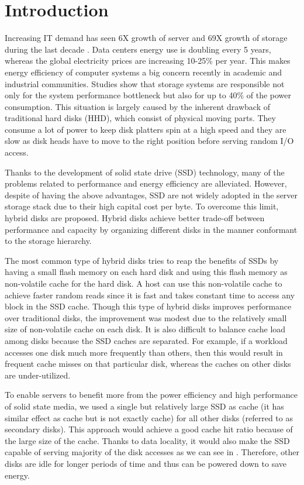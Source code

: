 \section{Introduction}
\label{intro}

Increasing IT demand has seen 6X growth of server and 69X growth of
storage during the last decade \cite{ibm_green_beyond}. Data centers
energy use is doubling every 5 years, whereas the global electricity
prices are increasing 10-25\% per year. This makes energy efficiency
of computer systems a big concern recently in academic and industrial
communities. Studies show that storage systems are responsible not
only for the system performance bottleneck but also for up to 40\% of
the power consumption\cite{storage_40}. This situation is largely
caused by the inherent drawback of traditional hard disks (HHD), which
consist of physical moving parts. They consume a lot of power to keep
disk platters spin at a high speed and they are slow as disk heads
have to move to the right position before serving random I/O access.

Thanks to the development of solid state drive (SSD) technology, many
of the problems related to performance and energy efficiency are
alleviated. However, despite of having the above advantages, SSD are
not widely adopted in the server storage stack due to their high
capital cost per byte. To overcome this limit, hybrid disks are
proposed. Hybrid disks achieve better trade-off between performance
and capacity by organizing different disks in the manner conformant to
the storage hierarchy. 

The most common type of hybrid disks \cite{Bisson07ahybrid} tries to
reap the benefits of SSDs by having a small flash memory on each hard
disk and using this flash memory as non-volatile cache for the hard
disk. A host can use this non-volatile cache to achieve faster random
reads since it is fast and takes constant time to access any block in
the SSD cache. Though this type of hybrid disks improves performance
over traditional disks, the improvement was modest due to the
relatively small size of non-volatile cache on each disk. It is also
difficult to balance cache load among disks because the SSD caches are
separated. For example, if a workload accesses one disk much more
frequently than others, then this would result in frequent cache
misses on that particular disk, whereas the caches on other disks are
under-utilized. 

To enable servers to benefit more from the power efficiency and high
performance of solid state media, we used a single but relatively
large SSD as cache (it has similar effect as cache but is not exactly
cache) for all other disks (referred to as secondary disks). This
approach would achieve a good cache hit ratio because of the large
size of the cache. Thanks to data locality, it would also make the SSD
capable of serving majority of the disk accesses as we can see in
\cite{Debnath_SkimpyStash, Debnath_Bloomflash,
flashcache_experiments}. Therefore, other disks are idle for longer
periods of time and thus can be powered down to save energy. 


